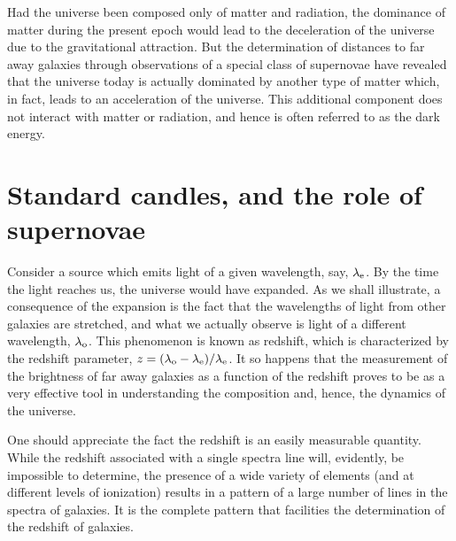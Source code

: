 \documentclass[12pt,a4paper,oneside]{book}
\begin{document}
\par 

Had the universe been composed only of matter and radiation, the dominance of
matter during the present epoch would lead to the deceleration of the universe 
due to the gravitational attraction. But the determination of distances to far
away galaxies through observations of a special class of supernovae have 
revealed that the universe today is actually dominated by another type of matter
which, in fact, leads to an acceleration of the universe.
This additional component does not interact with matter or radiation, and hence
is often referred to as the dark energy.


\section{Standard candles, and the role of supernovae}

Consider a source which emits light of a given wavelength, say, $\lambda_{\rm
e}$.
By the time the light reaches us, the universe would have expanded.
As we shall illustrate, a consequence of the expansion is the fact that the
wavelengths of light from other galaxies are stretched, and what we actually 
observe is light of a different wavelength, $\lambda_{\rm o}$. 
This phenomenon is known as redshift, which is characterized by the redshift 
parameter, $z= (\lambda_{\rm o}-\lambda_{\rm e})/\lambda_{\rm e}$. 
It so happens that the measurement of the brightness of far away galaxies as 
a function of the redshift proves to be as a very effective tool in
understanding 
the composition and, hence, the dynamics of the universe.

\par

One should appreciate the fact the redshift is an easily measurable quantity.
While the redshift associated with a single spectra line will, evidently, be 
impossible to determine, the presence of a wide variety of elements (and at
different levels of ionization) results in a pattern of a large number of 
lines in the spectra of galaxies. It is the complete pattern that facilities 
the determination of the redshift of galaxies.

\par
\end{document}
